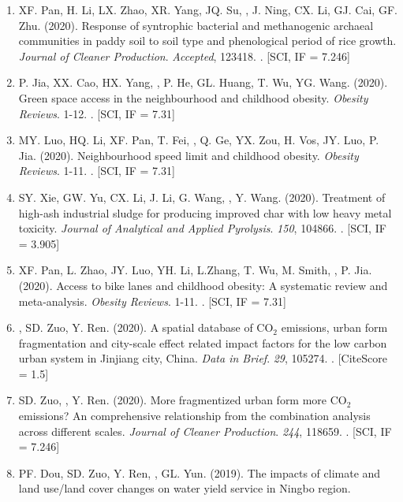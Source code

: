 \begin{enumerate}
\item
    XF. Pan, H. Li, LX. Zhao, XR. Yang, JQ. Su, \Shaoqing, J. Ning, CX. Li, GJ. Cai, GF. Zhu. (2020).
    Response of syntrophic bacterial and methanogenic archaeal communities in paddy soil to soil type and phenological period of rice growth.
    \textit{Journal of Cleaner Production}. \textit{Accepted}, 123418.
    . [SCI, IF = 7.246]
\item
    P. Jia, XX. Cao, HX. Yang, \Shaoqing, P. He, GL. Huang, T. Wu, YG. Wang. (2020).
    Green space access in the neighbourhood and childhood obesity.
    \textit{Obesity Reviews}. 1-12.
    . [SCI, IF = 7.31]
\item
    MY. Luo, HQ. Li, XF. Pan, T. Fei, \Shaoqing, Q. Ge, YX. Zou, H. Vos, JY. Luo, P. Jia. (2020).
    Neighbourhood speed limit and childhood obesity.
    \textit{Obesity Reviews}. 1-11.
    . [SCI, IF = 7.31]
\item
    SY. Xie, GW. Yu, CX. Li, J. Li, G. Wang, \Shaoqing, Y. Wang. (2020).
    Treatment of high-ash industrial sludge for producing improved char with low heavy metal toxicity.
    \textit{Journal of Analytical and Applied Pyrolysis}. \textit{150}, 104866.
    . [SCI, IF = 3.905]
\item
    XF. Pan, L. Zhao, JY. Luo, YH. Li, L.Zhang, T. Wu, M. Smith, \Shaoqing, P. Jia. (2020).
    Access to bike lanes and childhood obesity: A systematic review and meta‐analysis.
    \textit{Obesity Reviews}. 1-11.
    . [SCI, IF = 7.31]
\item
    \Shaoqing, SD. Zuo, Y. Ren. (2020).
    A spatial database of CO$_2$ emissions, urban form fragmentation and city-scale effect related impact factors for the low carbon urban system in Jinjiang city, China.
    \textit{Data in Brief}. \textit{29}, 105274.
    . [CiteScore = 1.5]
\item
    SD. Zuo, \Shaoqing, Y. Ren. (2020).
    More fragmentized urban form more CO$_2$ emissions? An comprehensive relationship from the combination analysis across different scales.
    \textit{Journal of Cleaner Production}. \textit{244}, 118659.
    . [SCI, IF = 7.246]
\item
    PF. Dou, SD. Zuo, Y. Ren, \Shaoqing, GL. Yun. (2019).
    The impacts of climate and land use/land cover changes on water yield service in Ningbo region.

\end{enumerate}
